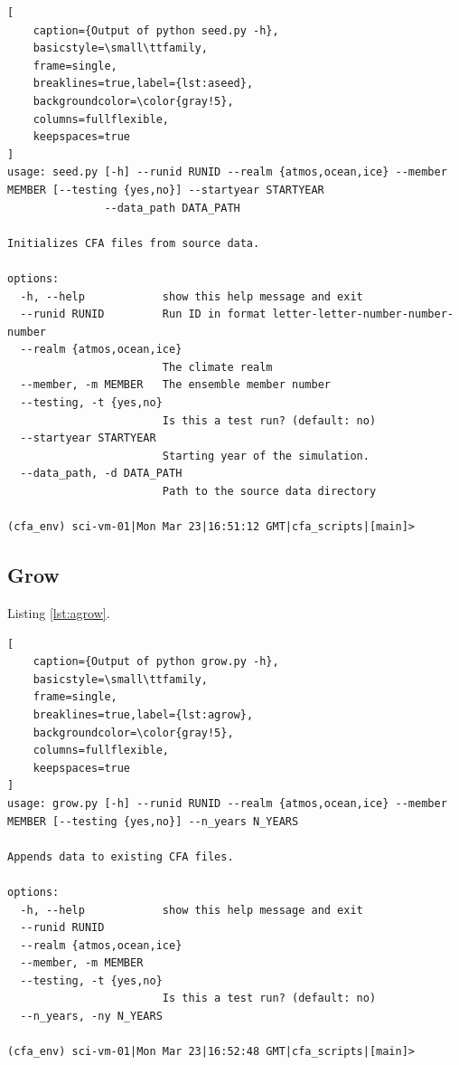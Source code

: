 \documentclass[11pt,a4paper]{article}
\begin{document}
\begin{minipage}{\textwidth}


\begin{lstlisting}[
    caption={Output of python seed.py -h},
    basicstyle=\small\ttfamily,
    frame=single,
    breaklines=true,label={lst:aseed},
    backgroundcolor=\color{gray!5},
    columns=fullflexible,
    keepspaces=true
]
usage: seed.py [-h] --runid RUNID --realm {atmos,ocean,ice} --member MEMBER [--testing {yes,no}] --startyear STARTYEAR
               --data_path DATA_PATH

Initializes CFA files from source data.

options:
  -h, --help            show this help message and exit
  --runid RUNID         Run ID in format letter-letter-number-number-number
  --realm {atmos,ocean,ice}
                        The climate realm
  --member, -m MEMBER   The ensemble member number
  --testing, -t {yes,no}
                        Is this a test run? (default: no)
  --startyear STARTYEAR
                        Starting year of the simulation.
  --data_path, -d DATA_PATH
                        Path to the source data directory

(cfa_env) sci-vm-01|Mon Mar 23|16:51:12 GMT|cfa_scripts|[main]> 
\end{lstlisting}
\end{minipage}


\subsection{Grow}

Listing \ref{lst:agrow}.

\begin{lstlisting}[
    caption={Output of python grow.py -h},
    basicstyle=\small\ttfamily,
    frame=single,
    breaklines=true,label={lst:agrow},
    backgroundcolor=\color{gray!5},
    columns=fullflexible,
    keepspaces=true
]
usage: grow.py [-h] --runid RUNID --realm {atmos,ocean,ice} --member MEMBER [--testing {yes,no}] --n_years N_YEARS

Appends data to existing CFA files.

options:
  -h, --help            show this help message and exit
  --runid RUNID
  --realm {atmos,ocean,ice}
  --member, -m MEMBER
  --testing, -t {yes,no}
                        Is this a test run? (default: no)
  --n_years, -ny N_YEARS

(cfa_env) sci-vm-01|Mon Mar 23|16:52:48 GMT|cfa_scripts|[main]> 
\end{lstlisting}
\end{document}
